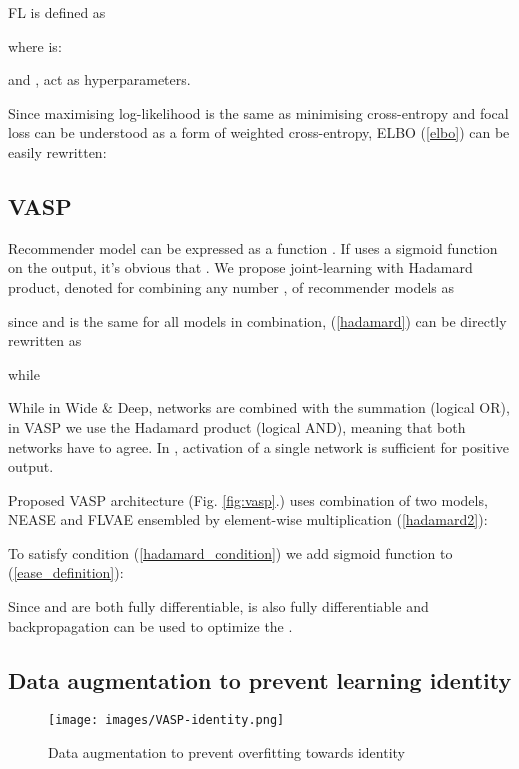 \documentclass[conference]{IEEEtran}
\begin{document}
        FL\cite{Lin2020} is defined as 
        
             where  is:
        
             and ,  act as hyperparameters.
        
        Since maximising log-likelihood is the same as minimising cross-entropy and focal loss can be understood as a form of weighted cross-entropy, ELBO (\ref{elbo}) can be easily rewritten:
        
            
    
    \subsection{VASP}\label{vasp}
    
        
        Recommender model  can be expressed as a function . If  uses a sigmoid function on the output, it's obvious that . 
        We propose joint-learning with Hadamard product\cite{million2007hadamard}, denoted  for combining any number ,  of recommender models  as 
        
            
        
        since  and  is the same for all models in combination, (\ref{hadamard}) can be directly rewritten as
        
            
        
        while
        
            
        
While in Wide \& Deep\cite{Cheng2016}, networks are combined with the summation (logical OR), in VASP we use the Hadamard product (logical AND), meaning that both networks have to agree. In \cite{Cheng2016}, activation of a single network is sufficient for positive output.
        
        Proposed VASP architecture (Fig. \ref{fig:vasp}.) uses combination of two models, NEASE and FLVAE ensembled by element-wise multiplication (\ref{hadamard2}):
    
            
        
        To satisfy condition (\ref{hadamard_condition}) we add sigmoid function to (\ref{ease_definition}):
            
            
        
        Since  and  are both fully differentiable,  is also fully differentiable and backpropagation can be used to optimize the .
        
    \subsection{Data augmentation to prevent learning identity}\label{pridentity} 
        \begin{figure*}[hb]
            \centering 
            \texttt{[image: images/VASP-identity.png]} 
            \caption{Data augmentation to prevent overfitting towards identity}
            \label{fig:vasp_identity}
        \end{figure*}
        
\end{document}
